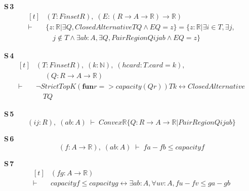 \noindent\textbf{S\,3}\quad{}
{\footnotesize\[ \begin{aligned}[t]
&(\mathit{T} : \mathit{Finset} \mathit{R}),\; (\mathit{E} : (\mathit{R} \to \mathit{A} \to \mathbb{R} ) \to \mathbb{R} )\\
\vdash\;&\{ \mathit{z} : \mathbb{R} | \exists \mathit{Q}, \mathit{ClosedAlternative} \mathit{T} \mathit{Q} \wedge \mathit{E} \mathit{Q} = \mathit{z}\} = \{ \mathit{z} : \mathbb{R} | \exists \mathit{i} \in \mathit{T}, \exists \mathit{j},\\
&\quad \mathit{j} \notin \mathit{T} \wedge \exists \mathit{a} \mathit{b} : \mathit{A}, \exists \mathit{Q}, \mathit{PairRegion} \mathit{Q} \mathit{i} \mathit{j} \mathit{a} \mathit{b} \wedge \mathit{E} \mathit{Q} = \mathit{z}\}
\end{aligned} \]}

\noindent\textbf{S\,4}\quad{}
{\footnotesize\[ \begin{aligned}[t]
&(\mathit{T} : \mathit{Finset} \mathit{R}),\; (\mathit{k} : \mathbb{N} ),\; (\mathit{hcard} : \mathit{T}.\mathit{card} = \mathit{k}),\\
&\quad \; (\mathit{Q} : \mathit{R} \to \mathit{A} \to \mathbb{R} )\\
\vdash\;&\neg \mathit{StrictTopK} (\mathbf{fun} \mathit{r} => \mathit{capacity} (\mathit{Q} \mathit{r})) \mathit{T} \mathit{k} \leftrightarrow \mathit{ClosedAlternative}\\
&\quad \mathit{T} \mathit{Q}
\end{aligned} \]}

\noindent\textbf{S\,5}\quad{}
{\footnotesize\[ (\mathit{i} \mathit{j} : \mathit{R}),\; (\mathit{a} \mathit{b} : \mathit{A}) \;\vdash\; \mathit{Convex} \mathbb{R} \{ \mathit{Q} : \mathit{R} \to \mathit{A} \to \mathbb{R} | \mathit{PairRegion} \mathit{Q} \mathit{i} \mathit{j} \mathit{a} \mathit{b}\} \]}

\noindent\textbf{S\,6}\quad{}
{\footnotesize\[ (\mathit{f} : \mathit{A} \to \mathbb{R} ),\; (\mathit{a} \mathit{b} : \mathit{A}) \;\vdash\; \mathit{f} \mathit{a} - \mathit{f} \mathit{b} \leq \mathit{capacity} \mathit{f} \]}

\noindent\textbf{S\,7}\quad{}
{\footnotesize\[ \begin{aligned}[t]
&(\mathit{f} \mathit{g} : \mathit{A} \to \mathbb{R} )\\
\vdash\;&\mathit{capacity} \mathit{f} \leq \mathit{capacity} \mathit{g} \leftrightarrow \exists \mathit{a} \mathit{b} : \mathit{A}, \forall \mathit{u} \mathit{v} : \mathit{A}, \mathit{f} \mathit{u} - \mathit{f} \mathit{v} \leq \mathit{g} \mathit{a} - \mathit{g} \mathit{b}
\end{aligned} \]}


